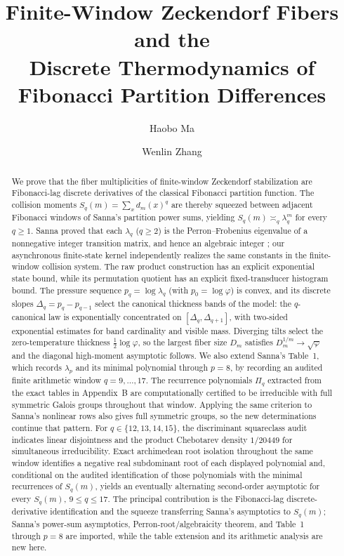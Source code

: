 \documentclass[12pt,reqno]{amsart}
\title[Finite-window Zeckendorf fibers]{%
  Finite-Window Zeckendorf Fibers and the\\
  Discrete Thermodynamics of Fibonacci Partition Differences}
\author{Haobo Ma}
\author{Wenlin Zhang}
\date{}
\theoremstyle{plain}
\theoremstyle{remark}
\theoremstyle{definition}
\numberwithin{equation}{section}
\begin{document}
\begin{abstract}
We prove that the fiber multiplicities of finite-window Zeckendorf
stabilization are Fibonacci-lag discrete derivatives of the classical
Fibonacci partition function.  The collision moments
$S_q(m)=\sum_{x}d_m(x)^q$ are thereby squeezed between adjacent
Fibonacci windows of Sanna's partition power sums, yielding
$S_q(m)\asymp_q\lambda_q^m$ for every $q\ge 1$.  Sanna proved that each
$\lambda_q$ ($q\ge 2$) is the Perron--Frobenius eigenvalue of a nonnegative
integer transition matrix, and hence an algebraic integer
\cite[Thm.~1]{Sanna2025}; our asynchronous finite-state kernel independently
realizes the same constants in the finite-window collision system.  The raw
product construction has an explicit exponential state bound, while its
permutation quotient has an explicit fixed-transducer histogram bound.  The
pressure sequence $p_q=\log\lambda_q$ (with $p_0=\log\varphi$) is convex, and
its discrete slopes $\Delta_q=p_q-p_{q-1}$ select the canonical
thickness bands of the model: the $q$-canonical law is exponentially
concentrated on $[\Delta_q,\Delta_{q+1}]$, with two-sided exponential
estimates for band cardinality and visible mass.  Diverging tilts
select the zero-temperature thickness $\frac12\log\varphi$, so the
largest fiber size $D_m$ satisfies $D_m^{1/m}\to\sqrt{\varphi}$ and
the diagonal high-moment asymptotic follows.  We also extend Sanna's
Table~1, which records $\lambda_p$ and its minimal polynomial through $p=8$,
by recording an audited finite arithmetic window $q=9,\dots,17$.  The
recurrence polynomials $\Pi_q$ extracted from the exact tables in Appendix~B
are computationally certified to be irreducible with full symmetric Galois
groups throughout that window.  Applying the same criterion to Sanna's
nonlinear rows also gives full symmetric groups, so the new determinations
continue that pattern.  For $q\in\{12,13,14,15\}$, the discriminant
squareclass audit indicates linear disjointness and the product Chebotarev
density $1/20449$ for simultaneous irreducibility.  Exact archimedean root
isolation throughout the same window identifies a negative real subdominant
root of each displayed polynomial and,
conditional on the audited identification of those polynomials with the
minimal recurrences of $S_q(m)$, yields an eventually alternating
second-order asymptotic for every $S_q(m)$, $9\le q\le17$.  The principal
contribution is the Fibonacci-lag discrete-derivative identification and the
squeeze transferring Sanna's asymptotics to $S_q(m)$; Sanna's power-sum
asymptotics, Perron-root/algebraicity theorem, and Table~1 through $p=8$ are
imported, while the table extension and its arithmetic analysis are new here.
\end{abstract}

\maketitle










\appendix




\end{document}
